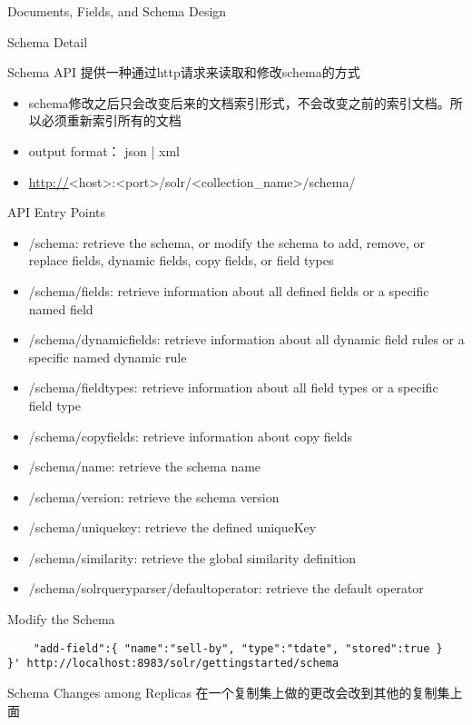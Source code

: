 \documentclass[presentation]{beamer}
\begin{document}
\begin{frame}[fragile,label={sec:orgc0e77e6}]{Documents, Fields, and Schema Design}
\begin{block}{Schema Detail}
\begin{block}{Schema API}
提供一种通过http请求来读取和修改schema的方式
\begin{itemize}
\item schema修改之后只会改变后来的文档索引形式，不会改变之前的索引文档。所以必须重新索引所有的文档
\item output format： json | xml
\item \url{http://}<host>:<port>/solr/<collection\_name>/schema/
\end{itemize}
\begin{block}{API Entry Points}
\begin{itemize}
\item /schema: retrieve the schema, or modify the schema to add, remove, or replace fields, dynamic fields, copy fields, or field types
\item /schema/fields: retrieve information about all defined fields or a specific named field
\item /schema/dynamicfields: retrieve information about all dynamic field rules or a specific named dynamic rule
\item /schema/fieldtypes: retrieve information about all field types or a specific field type
\item /schema/copyfields: retrieve information about copy fields
\item /schema/name: retrieve the schema name
\item /schema/version: retrieve the schema version
\item /schema/uniquekey: retrieve the defined uniqueKey
\item /schema/similarity: retrieve the global similarity definition
\item /schema/solrqueryparser/defaultoperator: retrieve the default operator
\end{itemize}
\end{block}

\begin{block}{Modify the Schema}
\begin{verbatim}
    "add-field":{ "name":"sell-by", "type":"tdate", "stored":true } 
}' http://localhost:8983/solr/gettingstarted/schema
\end{verbatim}

\begin{block}{Schema Changes among Replicas}
在一个复制集上做的更改会改到其他的复制集上面
\end{block}
\end{block}


\end{block}
\end{block}
\end{frame}
\end{document}
